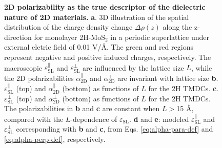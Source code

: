 \documentclass[journal=ancac3,manuscript=article,email=true,hyperref=true,keywords=false]{achemso}
\begin{document}
\label{sec:org34cbe74}
\begin{figure}[H]
\centering
\caption{\label{fig-1} \textbf{2D polarizability as the true
    descriptor of the dielectric nature of 2D materials.}
  \textbf{a}. 3D illustration of the spatial distribution of the
  charge density change $\Delta \rho(z)$ along the z-direction for
  monolayer 2H-MoS$_{2}$ in a periodic superlattice under external
  eletric field of 0.01 V/\AA{}.  The green and red regions represent
  negative and positive induced charges, respectively. The macroscopic
  $\varepsilon_{\mathrm{SL}}^{\parallel}$ and
  $\varepsilon_{\mathrm{SL}}^{\perp}$ are influenced by the lattice
  size $L$, while the 2D polarizabilities $\alpha_{\mathrm{2D}}^{\parallel}$ and
  $\alpha_{\mathrm{2D}}^{\perp}$ are invariant with lattice size \textbf{b}.
  $\varepsilon^{\parallel}_{\mathrm{SL}}$ (top) and
  $\alpha_{\mathrm{2D}}^{\parallel}$ (bottom) as functions of $L$ for
  the 2H TMDCs. \textbf{c}.  $\varepsilon^{\perp}_{\mathrm{SL}}$ (top)
  and $\alpha_{\mathrm{2D}}^{\perp}$ (bottom) as functions of $L$ for
  the 2H TMDCs. The polarizabilities in \textbf{b} and \textbf{c} are
  constant when $L>$15 \AA{}, compared with the $L$-dependence of
  $\varepsilon_{\mathrm{SL}}$. \textbf{d} and \textbf{e}: modeled
  $\varepsilon_{\mathrm{SL}}^{\parallel}$ and
  $\varepsilon_{\mathrm{SL}}^{\perp}$ corresponding with \textbf{b}
  and \textbf{c}, from Eqs. \ref{eq:alpha-para-def} and
  \ref{eq:alpha-perp-def}, respectively.}
\end{figure}

\end{document}
